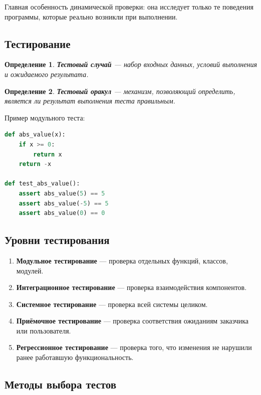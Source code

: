 \documentclass[12pt,a4paper]{article}
\newtheorem{definition}{Определение}
\begin{document}
Главная особенность динамической проверки: она исследует только те поведения программы, которые реально возникли при выполнении.

\subsection{Тестирование}

\begin{definition}
\textbf{Тестовый случай} --- набор входных данных, условий выполнения и ожидаемого результата.
\end{definition}

\begin{definition}
\textbf{Тестовый оракул} --- механизм, позволяющий определить, является ли результат выполнения теста правильным.
\end{definition}

Пример модульного теста:

\begin{lstlisting}[language=Python]
def abs_value(x):
    if x >= 0:
        return x
    return -x

def test_abs_value():
    assert abs_value(5) == 5
    assert abs_value(-5) == 5
    assert abs_value(0) == 0
\end{lstlisting}

\subsection{Уровни тестирования}

\begin{enumerate}
  \item \textbf{Модульное тестирование} --- проверка отдельных функций, классов, модулей.
  \item \textbf{Интеграционное тестирование} --- проверка взаимодействия компонентов.
  \item \textbf{Системное тестирование} --- проверка всей системы целиком.
  \item \textbf{Приёмочное тестирование} --- проверка соответствия ожиданиям заказчика или пользователя.
  \item \textbf{Регрессионное тестирование} --- проверка того, что изменения не нарушили ранее работавшую функциональность.
\end{enumerate}

\subsection{Методы выбора тестов}
\end{document}
